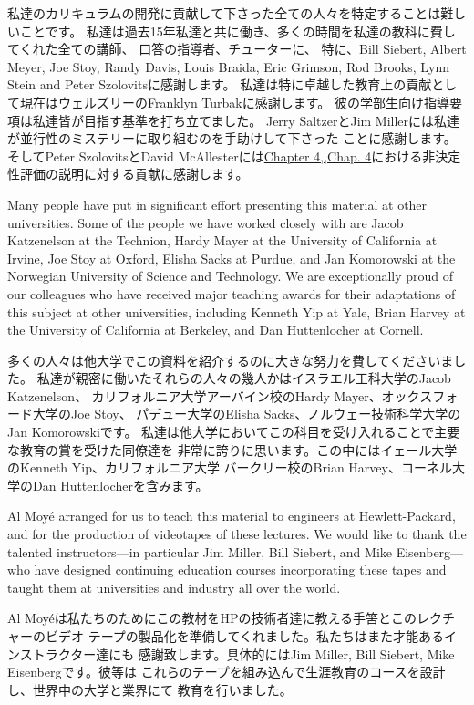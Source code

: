 \documentclass[oneside]{book}
\newcommand{\link}[1]{\hyperref[#1]{#1}}
\begin{document}
私達のカリキュラムの開発に貢献して下さった全ての人々を特定することは難しいことです。
私達は過去15年私達と共に働き、多くの時間を私達の教科に費してくれた全ての講師、
口答の指導者、チューターに、
特に、Bill Siebert, Albert Meyer,
Joe Stoy, Randy Davis, Louis Braida, Eric Grimson, Rod Brooks, Lynn Stein and
Peter Szolovitsに感謝します。
私達は特に卓越した教育上の貢献として現在はウェルズリーのFranklyn Turbakに感謝します。
彼の学部生向け指導要項は私達皆が目指す基準を打ち立てました。
Jerry SaltzerとJim Millerには私達が並行性のミステリーに取り組むのを手助けして下さった
ことに感謝します。そしてPeter SzolovitsとDavid McAllesterには\link{Chapter
4,,Chap. 4}における非決定性評価の説明に対する貢献に感謝します。

Many people have put in significant effort presenting this material at other
universities.  Some of the people we have worked closely with are Jacob
Katzenelson at the Technion, Hardy Mayer at the University of California at
Irvine, Joe Stoy at Oxford, Elisha Sacks at Purdue, and Jan Komorowski at the
Norwegian University of Science and Technology.  We are exceptionally proud of
our colleagues who have received major teaching awards for their adaptations of
this subject at other universities, including Kenneth Yip at Yale, Brian Harvey
at the University of California at Berkeley, and Dan Huttenlocher at Cornell.

多くの人々は他大学でこの資料を紹介するのに大きな努力を費してくださいました。
私達が親密に働いたそれらの人々の幾人かはイスラエル工科大学のJacob Katzenelson、
カリフォルニア大学アーバイン校のHardy Mayer、オックスフォード大学のJoe Stoy、
パデュー大学のElisha Sacks、ノルウェー技術科学大学のJan Komorowskiです。
私達は他大学においてこの科目を受け入れることで主要な教育の賞を受けた同僚達を
非常に誇りに思います。この中にはイェール大学のKenneth Yip、カリフォルニア大学
バークリー校のBrian Harvey、コーネル大学のDan Huttenlocherを含みます。

Al Moy\'e arranged for us to teach this material to engineers at
Hewlett-Packard, and for the production of videotapes of these lectures.  We
would like to thank the talented instructors---in particular Jim Miller, Bill
Siebert, and Mike Eisenberg---who have designed continuing education courses
incorporating these tapes and taught them at universities and industry all over
the world.

Al Moy\'eは私たちのためにこの教材をHPの技術者達に教える手筈とこのレクチャーのビデオ
テープの製品化を準備してくれました。私たちはまた才能あるインストラクター達にも
感謝致します。具体的にはJim Miller, Bill Siebert, Mike Eisenbergです。彼等は
これらのテープを組み込んで生涯教育のコースを設計し、世界中の大学と業界にて
教育を行いました。
\end{document}
